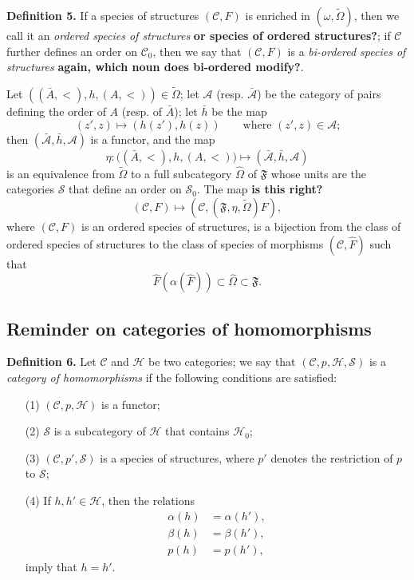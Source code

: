 \documentclass[a4paper,oneside,nobib,nofonts,notitlepage,notoc,nols,fleqn,justified]{tufte-book}
\newenvironment{rmenv}[1]
  {\phantomsection\par\medskip\noindent\textbf{#1.}\rmfamily}
  {\par\medskip}
\newcommand{\oldpage}[1]{{\reversemarginpar\marginnote{\raggedleft\footnotesize\textit{p.~#1}}}}
\newcommand{\unsure}[1]{{\color{purple}\textbf{#1}}}
\newcommand{\CC}{\mathcal{C}}
\newcommand{\HH}{\mathcal{H}}
\renewcommand{\SS}{\mathcal{S}}
\newcommand{\FF}{\mathfrak{F}}
\renewcommand{\AA}{\mathcal{A}}
\begin{document}
\begin{rmenv}{Definition 5}
\label{definition:5}
  If a species of structures $(\CC,F)$ is enriched in $(\omega,\widetilde{\Omega})$, then we call it an \emph{ordered species of structures} \unsure{or species of ordered structures?};
  if $\CC$ further defines an order on $\CC_0$, then we say that $(\CC,F)$ is a \emph{bi-ordered species of structures} \unsure{again, which noun does bi-ordered modify?}.
\end{rmenv}

Let $((\bar{A},<),h,(A,<))\in\widetilde{\Omega}$;
let $\AA$ (resp. $\bar{\AA}$) be the category of pairs defining the order of $A$ (resp. of $\bar{A}$);
let $\bar{h}$ be the map
\[
  (z',z)
  \longmapsto(h(z'),h(z))
  \qquad\text{where $(z',z)\in\AA$;}
\]
then $(\bar{\AA},\bar{h},\AA)$ is a functor, and the map
\[
  \eta\colon\big((\bar{A},<),h,(A,<)\big)
  \longmapsto(\bar{\AA},\bar{h},\AA)
\]
is an equivalence from $\widetilde{\Omega}$ to a full subcategory $\widehat{\Omega}$ of $\FF$ whose units are the categories $\SS$ that define an order on $\SS_0$.
The map \unsure{is this right?}
\[
  (\CC,F)
  \longmapsto (\CC,(\FF,\eta,\widetilde{\Omega})F),
\]
where $(\CC,F)$ is an ordered species of structures, is a bijection from the class of ordered species of structures to the class of species of morphisms $(\CC,\widehat{F})$ such that
\[
  \widehat{F}(\alpha(\widehat{F}))
  \subset \widehat{\Omega}
  \subset \FF.
\]



\subsection{Reminder on categories of homomorphisms}
\label{section:i.4}

\begin{rmenv}{Definition 6}
\label{definition:6}
  Let $\CC$ and $\HH$ be two categories;
  we say \cite{3a} that $(\CC,p,\HH,\SS)$ is a \emph{category of homomorphisms} if the following conditions are satisfied:
  \begin{enumerate}
    \item[\normalfont(1)]
      $(\CC,p,\HH)$ is a functor;
    \item[\normalfont(2)]
      \oldpage{357}
      $\SS$ is a subcategory of $\HH$ that contains $\HH_0$;
    \item[\normalfont(3)]
      $(\CC,p',\SS)$ is a species of structures, where $p'$ denotes the restriction of $p$ to $\SS$;
    \item[\normalfont(4)]
      If $h,h'\in\HH$, then the relations
      \[
        \begin{aligned}
          \alpha(h)
          &= \alpha(h'),
        \\\beta(h)
          &= \beta(h'),
        \\p(h)
          &= p(h'),
        \end{aligned}
      \]
      imply that $h=h'$.
  \end{enumerate}
\end{rmenv}
\end{document}
